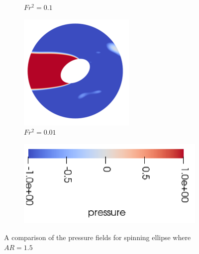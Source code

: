 \begin{figure}
\begin{subfigure}[b]{0.25\textwidth}
        \caption{$Fr^2 = 0.1$}
        \label{fig:par1p5fs0p1}
    \end{subfigure}
    \hfill
    \begin{subfigure}[b]{0.25\textwidth}
        \centering
        \includegraphics[width=\textwidth]{images/spinning_ellipse/par1p5fs0p01.png}
        \caption{$Fr^2 = 0.01$}
        \label{fig:par1p5fs0p01}
    \end{subfigure}
    
    \begin{subfigure}[b]{0.25\textwidth}
        \centering
        \includegraphics[width=\textwidth]{images/spinning_ellipse/p_scale.png}
        \caption*{}
    \end{subfigure}
    
    \caption{A comparison of the pressure fields for spinning ellipse where $AR = 1.5$}
    \label{fig:ar1p5_pressure}
\end{figure}

